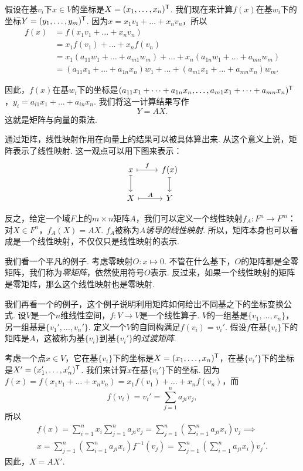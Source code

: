 假设在基$v_i$下$x\in V$的坐标是$X=(x_1,\dots,x_n)^{\mathsf{T}}$. 我们现在来计算$f(x)$在基$w_i$下的坐标$Y=(y_1,\dots,y_m)^{\mathsf{T}}$. 因为$x=x_1v_1+\dots+x_nv_n$，所以
\begin{align*}
    f(x)&=f(x_1v_1+\dots+x_nv_n)\\
    &=x_1f(v_1)+\dots+x_nf(v_n)\\
    &=x_1(a_{11}w_1+\dots+a_{m1}w_m)+\dots+x_n(a_{1n}w_1+\dots+a_{mn}w_m)\\
    &=(a_{11}x_1+\dots+a_{1n}x_n)w_1+\dots+(a_{m1}x_1+\dots+a_{mn}x_n)w_m.
\end{align*}

因此，$f(x)$在基$w_i$下的坐标是$(a_{11}x_1+\dots+a_{1n}x_n,\dots,a_{m1}x_1+\dots+a_{mn}x_n)^{\mathsf{T}}$，$y_i=a_{i1}x_1+\dots+a_{in}x_n$. 我们将这一计算结果写作
\[Y=AX.\]
这就是矩阵与向量的乘法.

通过矩阵，线性映射作用在向量上的结果可以被具体算出来. 从这个意义上说，矩阵表示了线性映射. 这一观点可以用下图来表示：
\[\begin{tikzcd}
    x\arrow[r,mapsto,"f"]\arrow[d,mapsto]&f(x)\arrow[d,mapsto]\\
    X\arrow[r,mapsto,"A"]&Y
    \end{tikzcd}\] 

反之，给定一个域$F$上的$m\times n$矩阵$A$，我们可以定义一个线性映射$f_A:F^n\to F^m$：对$X\in F^n$，$f_A(X)=AX$. $f_A$被称为$A$\textit{诱导的线性映射}. 所以，矩阵本身也可以看成是一个线性映射，不仅仅只是线性映射的表示. 

我们看一个平凡的例子. 考虑零映射$O:x\mapsto 0$. 不管在什么基下，$O$的矩阵都是全零矩阵，我们称为\textit{零矩阵}，依然使用符号$O$表示. 反过来，如果一个线性映射的矩阵是零矩阵，那么这个线性映射也是零映射. 

我们再看一个的例子，这个例子说明利用矩阵如何给出不同基之下的坐标变换公式. 设$V$是一个$n$维线性空间，$f:V\to V$是一个线性算子. $V$的一组基是$\{v_1,\dots,v_n\}$，另一组基是$\{v_1',\dots,v_n'\}$. 定义一个$V$的自同构满足$f(v_i)=v_i'$. 假设$f$在基$\{v_i\}$下的矩阵是$A$，这被称为基$\{v_i\}$到基$\{v_i'\}$的\textit{过渡矩阵}.

考虑一个点$x\in V$，它在基$\{v_i\}$下的坐标是$X=(x_1,\dots,x_n)^{\mathsf{T}}$，在基$\{v_i'\}$下的坐标是$X'=(x_1',\dots,x_n')^{\mathsf{T}}$. 我们来计算$x$在基$\{v_i'\}$下的坐标. 因为$f(x)=f(x_1v_1+\dots+x_nv_n)=x_1f(v_1)+\dots+x_nf(v_n)$，而
\[f(v_i)=v_i'=\sum_{j=1}^n a_{ji}v_j,\]
所以
\begin{gather*}
f(x)=\sum_{i=1}^n x_i\sum_{j=1}^n a_{ji}v_j=\sum_{j=1}^n\left(\sum_{i=1}^n a_{ji}x_i\right)v_j\implies\\
 x=\sum_{j=1}^n\left(\sum_{i=1}^n a_{ji}x_i\right)f^{-1}(v_j)=\sum_{j=1}^n\left(\sum_{i=1}^n a_{ji}x_i\right)v_j'.
\end{gather*}
因此，$X=AX'$.


